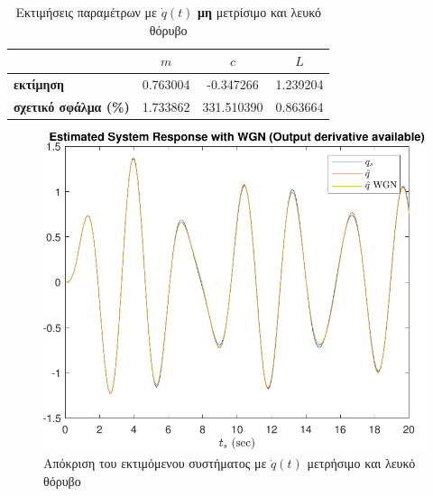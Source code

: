 \documentclass[a4paper,12pt]{article}
\begin{document}
\begin{table}[h!]
\centering
\begin{tabular}{|l|c|c|c|}
\hline
\multicolumn{1}{|c|}{} & \multicolumn{1}{c|}{$m$} & \multicolumn{1}{c|}{$c$} & \multicolumn{1}{c|}{$L$} \\
\hline
\textbf{εκτίμηση} & 0.763004 & -0.347266 & 1.239204 \\
\textbf{σχετικό σφάλμα (\%)} & 1.733862 & 331.510390 & 0.863664 \\
\hline
\end{tabular}
\caption{Εκτιμήσεις παραμέτρων με $\dot{q}(t)$ \textbf{μη} μετρίσιμο και λευκό θόρυβο}
\label{tab:task3_estimations_without_derivative_WGN}
\end{table}


\begin{figure}[!h]
    \centering
    \begin{minipage}{0.45\textwidth}
        \centering
        \includegraphics[width=\linewidth]{plot/task3_response_with_derivative_WGN.pdf}
        \caption{Απόκριση του εκτιμόμενου συστήματος με $\dot{q}(t)$ μετρήσιμο και λευκό θόρυβο}
        \label{fig:task3_response_with_derivative_WGN}
    \end{minipage}
    \hfill
    \begin{minipage}{0.45\textwidth}
        \centering

\end{minipage}
\end{figure}
\end{document}
